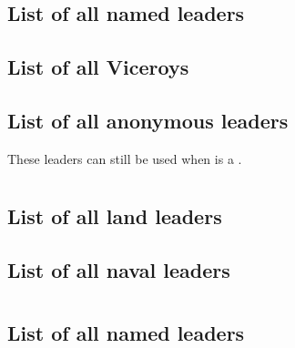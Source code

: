 \section{\paysmajeurPortugal}
\subsection{List of all named leaders}
\subsection{List of all Viceroys}
\subsection{List of all anonymous leaders}
\aparag These leaders can still be used when \paysPortugal is a \MIN.
\listanonymeportugal

\section{\paysmajeurRussie}
\subsection{List of all land leaders}
\subsection{List of all naval leaders}
\list@anonyme

\section{\paysmajeurSuede}
\subsection{List of all named leaders}
\list@anonyme

